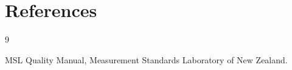 \section*{References}

\begingroup
\renewcommand{\section}[2]{}%

\begin{thebibliography}{9}

MSL Quality Manual, Measurement Standards Laboratory of New Zealand.

\end{thebibliography}

\endgroup